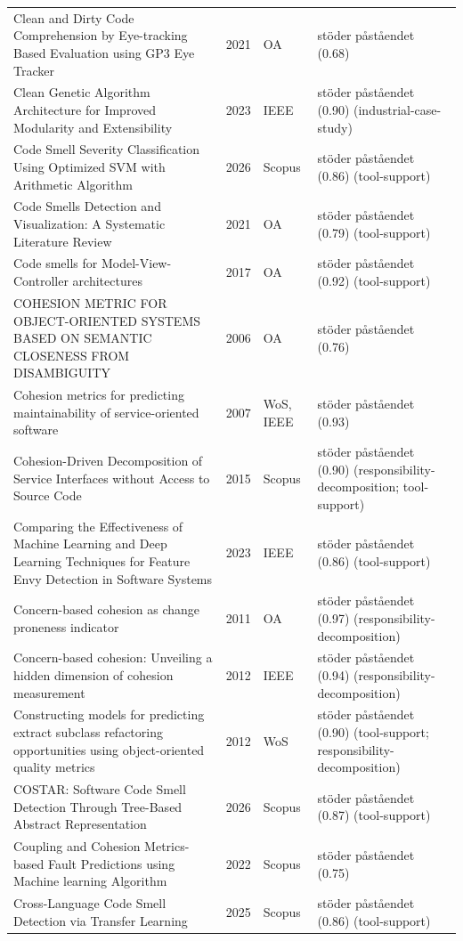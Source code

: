 \begin{longtable}{@{}%
  >{\raggedright\arraybackslash}p{}c%
  >{\raggedright\arraybackslash}p{}%
  >{\raggedright\arraybackslash}p{}@{}}
Clean and Dirty Code Comprehension by Eye-tracking Based Evaluation using GP3 Eye Tracker & 2021 & OA & stöder påståendet (0.68) \\
Clean Genetic Algorithm Architecture for Improved Modularity and Extensibility & 2023 & IEEE & stöder påståendet (0.90) (industrial-case-study) \\
Code Smell Severity Classification Using Optimized SVM with Arithmetic Algorithm & 2026 & Scopus & stöder påståendet (0.86) (tool-support) \\
Code Smells Detection and Visualization: A Systematic Literature Review & 2021 & OA & stöder påståendet (0.79) (tool-support) \\
Code smells for Model-View-Controller architectures & 2017 & OA & stöder påståendet (0.92) (tool-support) \\
COHESION METRIC FOR OBJECT-ORIENTED SYSTEMS BASED ON SEMANTIC CLOSENESS FROM DISAMBIGUITY & 2006 & OA & stöder påståendet (0.76) \\
Cohesion metrics for predicting maintainability of service-oriented software & 2007 & WoS, IEEE & stöder påståendet (0.93) \\
Cohesion-Driven Decomposition of Service Interfaces without Access to Source Code & 2015 & Scopus & stöder påståendet (0.90) (responsibility-decomposition; tool-support) \\
Comparing the Effectiveness of Machine Learning and Deep Learning Techniques for Feature Envy Detection in Software Systems & 2023 & IEEE & stöder påståendet (0.86) (tool-support) \\
Concern-based cohesion as change proneness indicator & 2011 & OA & stöder påståendet (0.97) (responsibility-decomposition) \\
Concern-based cohesion: Unveiling a hidden dimension of cohesion measurement & 2012 & IEEE & stöder påståendet (0.94) (responsibility-decomposition) \\
Constructing models for predicting extract subclass refactoring opportunities using object-oriented quality metrics & 2012 & WoS & stöder påståendet (0.90) (tool-support; responsibility-decomposition) \\
COSTAR: Software Code Smell Detection Through Tree-Based Abstract Representation & 2026 & Scopus & stöder påståendet (0.87) (tool-support) \\
Coupling and Cohesion Metrics-based Fault Predictions using Machine learning Algorithm & 2022 & Scopus & stöder påståendet (0.75) \\
Cross-Language Code Smell Detection via Transfer Learning & 2025 & Scopus & stöder påståendet (0.86) (tool-support) \\

\end{longtable}
